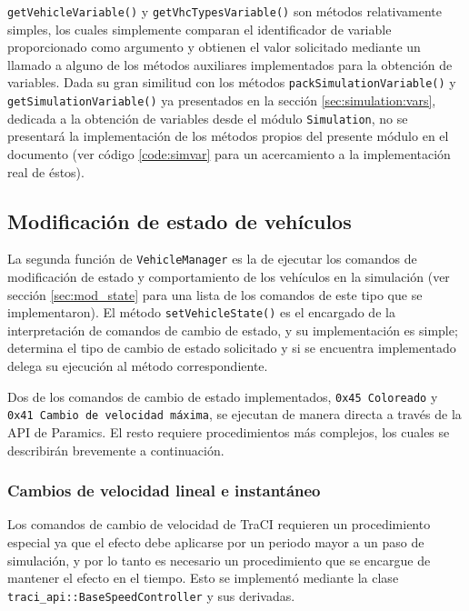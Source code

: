 \texttt{getVehicleVariable()} y \texttt{getVhcTypesVariable()} son métodos relativamente simples, los cuales simplemente comparan el identificador de variable proporcionado como argumento y obtienen el valor solicitado mediante un llamado a alguno de los métodos auxiliares implementados para la obtención de variables. Dada su gran similitud con los métodos \texttt{packSimulationVariable()} y \texttt{getSimulationVariable()} ya presentados en la sección \ref{sec:simulation:vars}, dedicada a la obtención de variables desde el módulo \texttt{Simulation}, no se presentará la implementación de los métodos propios del presente módulo en el documento (ver código \ref{code:simvar} para un acercamiento a la implementación real de éstos).

\subsection{Modificación de estado de vehículos}

La segunda función de \texttt{VehicleManager} es la de ejecutar los comandos de modificación de estado y comportamiento de los vehículos en la simulación (ver sección \ref{sec:mod_state} para una lista de los comandos de este tipo que se implementaron). El método \texttt{setVehicleState()} es el encargado de la interpretación de comandos de cambio de estado, y su implementación es simple; determina el tipo de cambio de estado solicitado y si se encuentra implementado delega su ejecución al método correspondiente.

Dos de los comandos de cambio de estado implementados, \texttt{0x45 Coloreado} y \texttt{0x41 Cambio de velocidad máxima}, se ejecutan de manera directa a través de la API de Paramics. El resto requiere procedimientos más complejos, los cuales se describirán brevemente a continuación.

\subsubsection{Cambios de velocidad lineal e instantáneo}\label{sec:speedoverride}

Los comandos de cambio de velocidad de TraCI requieren un procedimiento especial ya que el efecto debe aplicarse por un periodo mayor a un paso de simulación, y por lo tanto es necesario un procedimiento que se encargue de mantener el efecto en el tiempo. Esto se implementó mediante la clase \texttt{traci\_api::BaseSpeedController} y sus derivadas.


